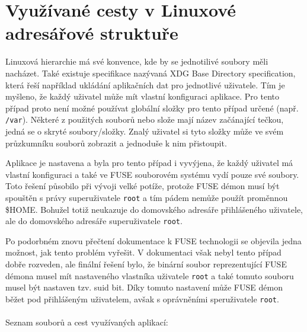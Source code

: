 \section{Využívané cesty v Linuxové adresářové struktuře}

Linuxová hierarchie má své konvence, kde by se jednotilivé soubory měli nacházet. Také existuje specifikace nazývaná XDG Base Directory specification, která
řeší například ukládání aplikačních dat pro jednotlivé uživatele. Tím je myšleno, že každý uživatel může mít vlastní konfiguraci aplikace. Pro tento případ proto není
možné používat globální složky pro tento případ určené (např. \texttt{/var}). Některé z použitých souborů nebo slože mají název začánající tečkou, jedná se o skryté
soubory/složky. Znalý uživatel si tyto složky může ve svém průzkumníku souborů zobrazit a jednoduše k nim přistoupit.

Aplikace je nastavena a byla pro tento případ i vyvýjena, že každý uživatel má vlastní konfiguraci a také ve FUSE souborovém systému vydí pouze své soubory. Toto řešení
působilo při vývoji velké potíže, protože FUSE démon musí být spouštěn s právy superuživatele \texttt{root} a tím pádem nemůže použít proměnnou \$HOME. Bohužel totiž neukazuje
do domovského adresáře přihlášeného uživatele, ale do domovského adresáře superuživatele \texttt{root}.

Po podorbném znovu přečtení dokumentace k FUSE technologii se objevila jedna možnost, jak tento problém vyřešit. V dokumentaci však nebyl tento případ dobře rozveden, ale 
finální řešení bylo, že binární soubor reprezentující FUSE démona musel mít nastaveného vlastníka uživatele \texttt{root} a také tomuto souboru musel být nastaven 
tzv. suid bit. Díky tomuto nastavení může FUSE démon běžet pod přihlášeným uživatelem, avšak s oprávněními speruživatele \texttt{root}.
\\\\
\noindent Seznam souborů a cest využívaných aplikací:

